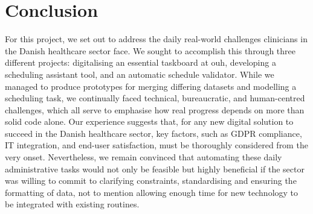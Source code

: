 \section{Conclusion}
For this project, we set out to address the daily real-world challenges clinicians in the Danish healthcare sector face. We sought to accomplish this through three different projects: digitalising an essential taskboard at \acrshort{ouh}, developing a scheduling assistant tool, and an automatic schedule validator. While we managed to produce prototypes for merging differing datasets and modelling a scheduling task, we continually faced technical, bureaucratic, and human-centred challenges, which all serve to emphasise how real progress depends on more than solid code alone. Our experience suggests that, for any new digital solution to succeed in the Danish healthcare sector, key factors, such as GDPR compliance, IT integration, and end-user satisfaction, must be thoroughly considered from the very onset. Nevertheless, we remain convinced that automating these daily administrative tasks would not only be feasible but highly beneficial if the sector was willing to commit to clarifying constraints, standardising and ensuring the formatting of data, not to mention allowing enough time for new technology to be integrated with existing routines.